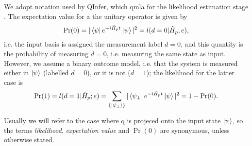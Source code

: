 We adopt notation used by QInfer, which \gls{qmla} for the likelihood estimation stage \cite{qinfer-1_0}. 
The expectation value for a the unitary operator is given by
\begin{equation}\label{eqn:pr0}
    \Pr(0) =  |\bra{\psi} e^{-i \hat{H}_p t} \ket{\psi}|^2  = l(d=0 | \hat{H}_p; e), 
\end{equation}
    i.e. the input basis is assigned the measurement label $d=0$, and this quantity is the probability 
    of measuring $d=0$, i.e. measuring the same state as input. 
However, we assume a binary outcome model, 
    i.e. that the system is measured either in $\ket{\psi}$ (labelled $d=0$), or it is not ($d=1$);
    the likelihood for the latter case is
\begin{equation}\label{eqn:pr1}
    \Pr(1) = l(d=1 | \hat{H}_p; e) = \sum_{\{\ket{\psi_{\perp}}\}} | \bra{\psi_{\perp}} e^{-i \hat{H}_p t} \ket{\psi}  |^2 = 1 - \Pr(0).
\end{equation}
\par 
Usually we will refer to the case where \gls{q} is projeced onto the input state $\ket{\psi}$, 
    so the terms \emph{likelihood}, \emph{expectation value} and \emph{$\Pr(0)$} are synonymous, 
    unless otherwise stated. 



